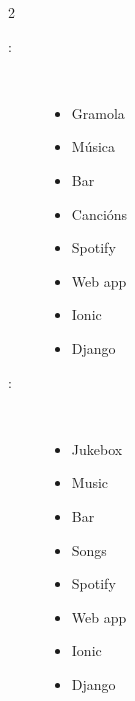 \begin{multicols}{2}
\begin{description}
\item [\palabraschaveprincipal:] \mbox{} \\[-20pt]
	\begin{itemize}
			\item Gramola
			\item Música
			\item Bar
			\item Cancións
			\item Spotify
			\item Web app
			\item Ionic
			\item Django
	\end{itemize}
\end{description}
\begin{description}
\item [\palabraschavesecundaria:] \mbox{} \\[-20pt]
	\begin{itemize}
			\item Jukebox
			\item Music
			\item Bar
			\item Songs
			\item Spotify
			\item Web app
			\item Ionic
			\item Django
	\end{itemize}
\end{description}
\end{multicols}
